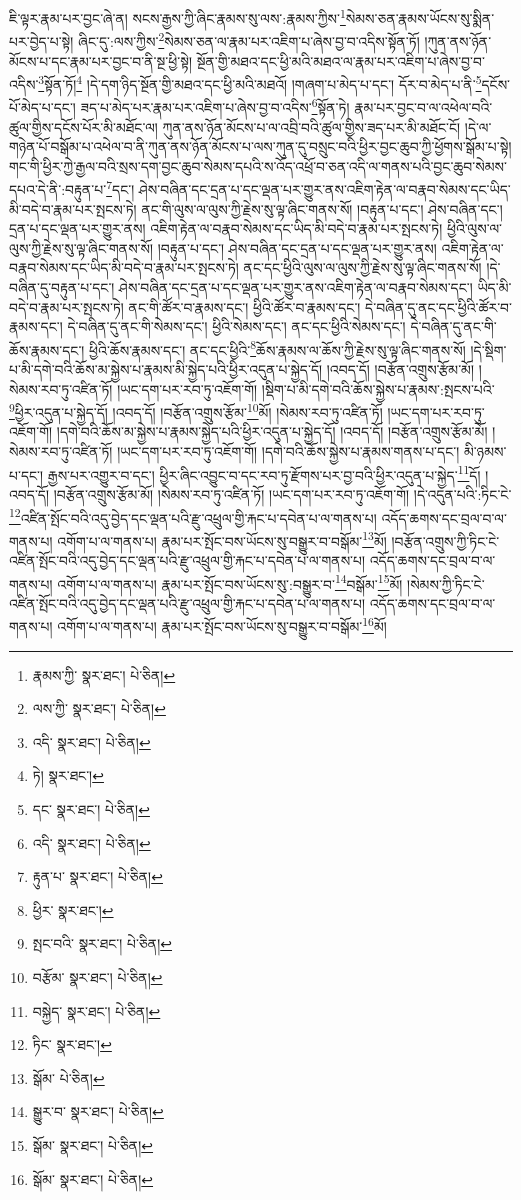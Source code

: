 ཇི་ལྟར་རྣམ་པར་བྱང་ཞེ་ན། སངས་རྒྱས་ཀྱི་ཞིང་རྣམས་སུ་ལས་:རྣམས་ཀྱིས་\footnote{རྣམས་ཀྱི་  སྣར་ཐང་།  པེ་ཅིན། }སེམས་ཅན་རྣམས་ཡོངས་སུ་སྨིན་པར་བྱེད་པ་སྟེ། ཞིང་དུ་:ལས་ཀྱིས་\footnote{ལས་ཀྱི་  སྣར་ཐང་།  པེ་ཅིན། }སེམས་ཅན་ལ་རྣམ་པར་འཇིག་པ་ཞེས་བྱ་བ་འདིས་སྟོན་ཏོ། །ཀུན་ནས་ཉོན་མོངས་པ་དང་རྣམ་པར་བྱང་བ་ནི་སྔ་ཕྱི་སྟེ། སྔོན་གྱི་མཐའ་དང་ཕྱི་མའི་མཐའ་ལ་རྣམ་པར་འཇིག་པ་ཞེས་བྱ་བ་འདིས་\footnote{འདི་  སྣར་ཐང་།  པེ་ཅིན། }སྟོན་ཏོ།\footnote{ཏེ།  སྣར་ཐང་། } །དེ་དག་ཉིད་སྔོན་གྱི་མཐའ་དང་ཕྱི་མའི་མཐའོ། །གཞག་པ་མེད་པ་དང་། དོར་བ་མེད་པ་ནི་\footnote{དང་  སྣར་ཐང་།  པེ་ཅིན། }དངོས་པོ་མེད་པ་དང་། ཟད་པ་མེད་པར་རྣམ་པར་འཇིག་པ་ཞེས་བྱ་བ་འདིས་\footnote{འདི་  སྣར་ཐང་།  པེ་ཅིན། }སྟོན་ཏེ། རྣམ་པར་བྱང་བ་ལ་འཕེལ་བའི་ཚུལ་གྱིས་དངོས་པོར་མི་མཐོང་ལ། ཀུན་ནས་ཉོན་མོངས་པ་ལ་འབྲི་བའི་ཚུལ་གྱིས་ཟད་པར་མི་མཐོང་ངོ། །དེ་ལ་གཉེན་པོ་བསྒོམ་པ་འཕེལ་བ་ནི་ཀུན་ནས་ཉོན་མོངས་པ་ལས་ཀུན་དུ་བསྲུང་བའི་ཕྱིར་བྱང་ཆུབ་ཀྱི་ཕྱོགས་སྒོམ་པ་སྟེ། གང་གི་ཕྱིར་ཀྱེ་རྒྱལ་བའི་སྲས་དག་བྱང་ཆུབ་སེམས་དཔའི་ས་འོད་འཕྲོ་བ་ཅན་འདི་ལ་གནས་པའི་བྱང་ཆུབ་སེམས་དཔའ་དེ་ནི་:བརྟུན་པ་\footnote{རྟུན་པ་  སྣར་ཐང་།  པེ་ཅིན། }དང་། ཤེས་བཞིན་དང་དྲན་པ་དང་ལྡན་པར་གྱུར་ནས་འཇིག་རྟེན་ལ་བརྣབ་སེམས་དང་ཡིད་མི་བདེ་བ་རྣམ་པར་སྤངས་ཏེ། ནང་གི་ལུས་ལ་ལུས་ཀྱི་རྗེས་སུ་ལྟ་ཞིང་གནས་སོ། །བརྟུན་པ་དང་། ཤེས་བཞིན་དང་། དྲན་པ་དང་ལྡན་པར་གྱུར་ནས། འཇིག་རྟེན་ལ་བརྣབ་སེམས་དང་ཡིད་མི་བདེ་བ་རྣམ་པར་སྤངས་ཏེ། ཕྱིའི་ལུས་ལ་ལུས་ཀྱི་རྗེས་སུ་ལྟ་ཞིང་གནས་སོ། །བརྟུན་པ་དང་། ཤེས་བཞིན་དང་དྲན་པ་དང་ལྡན་པར་གྱུར་ནས། འཇིག་རྟེན་ལ་བརྣབ་སེམས་དང་ཡིད་མི་བདེ་བ་རྣམ་པར་སྤངས་ཏེ། ནང་དང་ཕྱིའི་ལུས་ལ་ལུས་ཀྱི་རྗེས་སུ་ལྟ་ཞིང་གནས་སོ། །དེ་བཞིན་དུ་བརྟུན་པ་དང་། ཤེས་བཞིན་དང་དྲན་པ་དང་ལྡན་པར་གྱུར་ནས་འཇིག་རྟེན་ལ་བརྣབ་སེམས་དང་། ཡིད་མི་བདེ་བ་རྣམ་པར་སྤངས་ཏེ། ནང་གི་ཚོར་བ་རྣམས་དང་། ཕྱིའི་ཚོར་བ་རྣམས་དང་། དེ་བཞིན་དུ་ནང་དང་ཕྱིའི་ཚོར་བ་རྣམས་དང་། དེ་བཞིན་དུ་ནང་གི་སེམས་དང་། ཕྱིའི་སེམས་དང་། ནང་དང་ཕྱིའི་སེམས་དང་། དེ་བཞིན་དུ་ནང་གི་ཆོས་རྣམས་དང་། ཕྱིའི་ཆོས་རྣམས་དང་། ནང་དང་ཕྱིའི་\footnote{ཕྱིར་  སྣར་ཐང་། }ཆོས་རྣམས་ལ་ཆོས་ཀྱི་རྗེས་སུ་ལྟ་ཞིང་གནས་སོ། །དེ་སྡིག་པ་མི་དགེ་བའི་ཆོས་མ་སྐྱེས་པ་རྣམས་མི་སྐྱེད་པའི་ཕྱིར་འདུན་པ་སྐྱེད་དོ། །འབད་དོ། །བརྩོན་འགྲུས་རྩོམ་མོ། །སེམས་རབ་ཏུ་འཛིན་ཏོ། །ཡང་དག་པར་རབ་ཏུ་འཇོག་གོ། །སྡིག་པ་མི་དགེ་བའི་ཆོས་སྐྱེས་པ་རྣམས་:སྤངས་པའི་\footnote{སྤང་བའི་  སྣར་ཐང་།  པེ་ཅིན། }ཕྱིར་འདུན་པ་སྐྱེད་དོ། །འབད་དོ། །བརྩོན་འགྲུས་རྩོམ་\footnote{བརྩོམ་  སྣར་ཐང་།  པེ་ཅིན། }མོ། །སེམས་རབ་ཏུ་འཛིན་ཏོ། །ཡང་དག་པར་རབ་ཏུ་འཇོག་གོ། །དགེ་བའི་ཆོས་མ་སྐྱེས་པ་རྣམས་སྐྱེད་པའི་ཕྱིར་འདུན་པ་སྐྱེད་དོ། །འབད་དོ། །བརྩོན་འགྲུས་རྩོམ་མོ། །སེམས་རབ་ཏུ་འཛིན་ཏོ། །ཡང་དག་པར་རབ་ཏུ་འཇོག་གོ། །དགེ་བའི་ཆོས་སྐྱེས་པ་རྣམས་གནས་པ་དང་། མི་ཉམས་པ་དང་། རྒྱས་པར་འགྱུར་བ་དང་། ཕྱིར་ཞིང་འབྱུང་བ་དང་རབ་ཏུ་རྫོགས་པར་བྱ་བའི་ཕྱིར་འདུན་པ་སྐྱེད་\footnote{བསྐྱེད་  སྣར་ཐང་།  པེ་ཅིན། }དོ། །འབད་དོ། །བརྩོན་འགྲུས་རྩོམ་མོ། །སེམས་རབ་ཏུ་འཛིན་ཏོ། །ཡང་དག་པར་རབ་ཏུ་འཇོག་གོ། །དེ་འདུན་པའི་:ཏིང་ངེ་\footnote{ཏིང་  སྣར་ཐང་། }འཛིན་སྤོང་བའི་འདུ་བྱེད་དང་ལྡན་པའི་རྫུ་འཕྲུལ་གྱི་རྐང་པ་དབེན་པ་ལ་གནས་པ། འདོད་ཆགས་དང་བྲལ་བ་ལ་གནས་པ། འགོག་པ་ལ་གནས་པ། རྣམ་པར་སྤོང་བས་ཡོངས་སུ་བསྒྱུར་བ་བསྒོམ་\footnote{སྒོམ་  པེ་ཅིན། }མོ། །བརྩོན་འགྲུས་ཀྱི་ཏིང་ངེ་འཛིན་སྤོང་བའི་འདུ་བྱེད་དང་ལྡན་པའི་རྫུ་འཕྲུལ་གྱི་རྐང་པ་དབེན་པ་ལ་གནས་པ། འདོད་ཆགས་དང་བྲལ་བ་ལ་གནས་པ། འགོག་པ་ལ་གནས་པ། རྣམ་པར་སྤོང་བས་ཡོངས་སུ་:བསྒྱུར་བ་\footnote{སྒྱུར་བ་  སྣར་ཐང་།  པེ་ཅིན། }བསྒོམ་\footnote{སྒོམ་  སྣར་ཐང་།  པེ་ཅིན། }མོ། །སེམས་ཀྱི་ཏིང་ངེ་འཛིན་སྤོང་བའི་འདུ་བྱེད་དང་ལྡན་པའི་རྫུ་འཕྲུལ་གྱི་རྐང་པ་དབེན་པ་ལ་གནས་པ། འདོད་ཆགས་དང་བྲལ་བ་ལ་གནས་པ། འགོག་པ་ལ་གནས་པ། རྣམ་པར་སྤོང་བས་ཡོངས་སུ་བསྒྱུར་བ་བསྒོམ་\footnote{སྒོམ་  སྣར་ཐང་།  པེ་ཅིན། }མོ། 